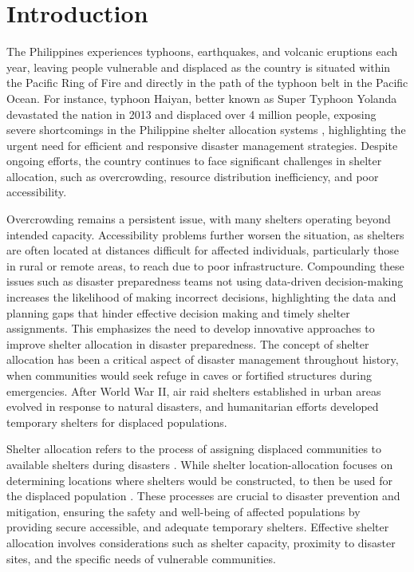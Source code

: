 \documentclass[11pt,letterpaper,]{article}
\begin{document}
\section{Introduction}
	The Philippines experiences typhoons, earthquakes, and volcanic eruptions each year, leaving people vulnerable and displaced as the country is situated within the Pacific Ring of Fire and directly in the path of the typhoon belt in the Pacific Ocean. For instance, typhoon Haiyan, better known as Super Typhoon Yolanda devastated the nation in 2013 and displaced over 4 million people, exposing severe shortcomings in the Philippine shelter allocation systems \parencite{Iuchi2019}, highlighting the urgent need for efficient and responsive disaster management strategies. Despite ongoing efforts, the country continues to face significant challenges in shelter allocation, such as overcrowding, resource distribution inefficiency, and poor accessibility.
	
	Overcrowding remains a persistent issue, with many shelters operating beyond intended capacity. Accessibility problems further worsen the situation, as shelters are often located at distances difficult for affected individuals, particularly those in rural or remote areas, to reach due to poor infrastructure. Compounding these issues such as disaster preparedness teams not using data-driven decision-making increases the likelihood of making incorrect decisions, highlighting the data and planning gaps that hinder effective decision making and timely shelter assignments. This emphasizes the need to develop innovative approaches to improve shelter allocation in disaster preparedness.
	The concept of shelter allocation has been a critical aspect of disaster management throughout history, when communities would seek refuge in caves or fortified structures during emergencies. After World War II, air raid shelters established in urban areas evolved in response to natural disasters, and humanitarian efforts developed temporary shelters for displaced populations.
	
	Shelter allocation refers to the process of assigning displaced communities to available shelters during disasters \parencite{Yin2023}. While shelter location-allocation focuses on determining locations where shelters would be constructed, to then be used for the displaced population \parencite{Xiujuan2019}. These processes are crucial to disaster prevention and mitigation, ensuring the safety and well-being of affected populations by providing secure accessible, and adequate temporary shelters. Effective shelter allocation involves considerations such as shelter capacity, proximity to disaster sites, and the specific needs of vulnerable communities.
	
\end{document}

